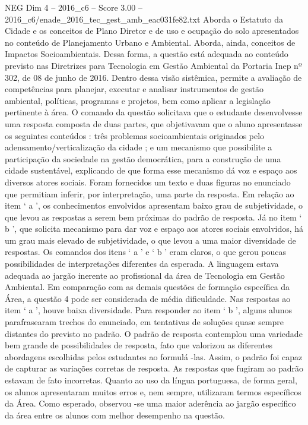 \begin{textsample}{NEG Dim 4 – 2016\_c6 – Score 3.00 – 2016\_c6/enade\_2016\_tec\_gest\_amb\_eac031fe82.txt}
Aborda o Estatuto da Cidade e os conceitos de Plano Diretor e de uso e ocupação do solo apresentados no conteúdo de Planejamento Urbano e Ambiental.
Aborda, ainda, conceitos de Impactos Socioambientais.
Dessa forma, a questão está adequada ao conteúdo previsto nas Diretrizes para Tecnologia em Gestão Ambiental da Portaria Inep nº 302, de 08 de junho de 2016.
Dentro dessa visão sistêmica, permite a avaliação de competências para planejar, executar e analisar instrumentos de gestão ambiental, políticas, programas e projetos, bem como aplicar a legislação pertinente à área.
O comando da questão solicitava que o estudante desenvolvesse uma resposta composta de duas partes, que objetivavam que o aluno apresentasse os seguintes conteúdos : três problemas socioambientais originados pelo adensamento/verticalização da cidade ; e um mecanismo que possibilite a participação da sociedade na gestão democrática, para a construção de uma cidade sustentável, explicando de que forma esse mecanismo dá voz e espaço aos diversos atores sociais.
Foram fornecidos um texto e duas figuras no enunciado que permitiam inferir, por interpretação, uma parte da resposta.
Em relação ao item ‘ a ’, os conhecimentos envolvidos apresentam baixo grau de subjetividade, o que levou as respostas a serem bem próximas do padrão de resposta.
Já no item ‘ b ’, que solicita mecanismo para dar voz e espaço aos atores sociais envolvidos, há um grau mais elevado de subjetividade, o que levou a uma maior diversidade de respostas.
Os comandos dos itens ‘ a ’ e ‘ b ’ eram claros, o que gerou poucas possibilidades de interpretações diferentes da esperada.
A linguagem estava adequada ao jargão inerente ao profissional da área de Tecnologia em Gestão Ambiental.
Em comparação com as demais questões de formação específica da Área, a questão 4 pode ser considerada de média dificuldade.
Nas respostas ao item ‘ a ’, houve baixa diversidade.
Para responder ao item ‘ b ’, alguns alunos parafrasearam trechos do enunciado, em tentativas de soluções quase sempre distantes do previsto no padrão.
O padrão de resposta contemplou uma variedade bem grande de possibilidades de resposta, fato que valorizou as diferentes abordagens escolhidas pelos estudantes ao formulá -las.
Assim, o padrão foi capaz de capturar as variações corretas de resposta.
As respostas que fugiram ao padrão estavam de fato incorretas.
Quanto ao uso da língua portuguesa, de forma geral, os alunos apresentaram muitos erros e, nem sempre, utilizaram termos específicos da Área.
Como esperado, observou -se uma maior aderência ao jargão específico da área entre os alunos com melhor desempenho na questão.

\end{textsample}
